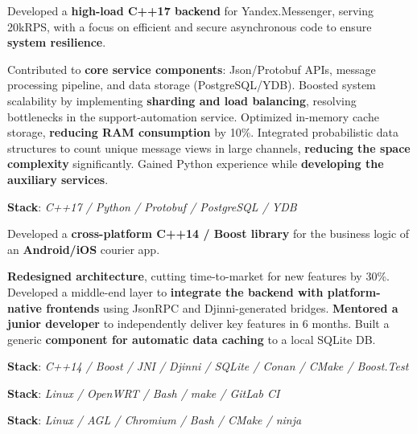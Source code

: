 \documentclass[]{deedy-resume}
\begin{document}
\begin{minipage}[t]{0.70\textwidth}
\sectionspace



Developed a \textbf{high-load C++17 backend} for Yandex.Messenger, serving 20kRPS, with a focus on efficient and secure asynchronous code to ensure \textbf{system resilience}.
\begin{descritemize}
    \descritem Contributed to \textbf{core service components}: Json/Protobuf APIs, message processing pipeline, and data storage (PostgreSQL/YDB).
    \descritem Boosted system scalability by implementing  \textbf{sharding and load balancing}, resolving bottlenecks in the support-automation service.
    \descritem Optimized in-memory cache storage, \textbf{reducing RAM consumption} by 10\%.
    \descritem Integrated probabilistic data structures to count unique message views in large channels, \textbf{reducing the space complexity} significantly.
    \descritem Gained Python experience while \textbf{developing the auxiliary services}.
\end{descritemize}
\textbf{Stack}: \textit{C++17 / Python / Protobuf / PostgreSQL / YDB}

\sectionspace



Developed a \textbf{cross-platform C++14 / Boost library} for the business logic of an \textbf{Android/iOS} courier app.
\begin{descritemize}
    \descritem \textbf{Redesigned architecture}, cutting time-to-market for new features by 30\%.
    \descritem Developed a middle-end layer to \textbf{integrate the backend with platform-native frontends} using JsonRPC and Djinni-generated bridges.
    \descritem \textbf{Mentored a junior developer} to independently deliver key features in 6 months.
    \descritem Built a generic \textbf{component for automatic data caching} to a local SQLite DB.
\end{descritemize}
\textbf{Stack}: \textit{C++14 / Boost / JNI / Djinni / SQLite / Conan / CMake / Boost.Test}

\sectionspace


\textbf{Stack}: \textit{Linux / OpenWRT / Bash / make /  GitLab CI}
\sectionspace


\textbf{Stack}: \textit{Linux / AGL / Chromium / Bash / CMake / ninja}

\end{minipage}
\end{document}
